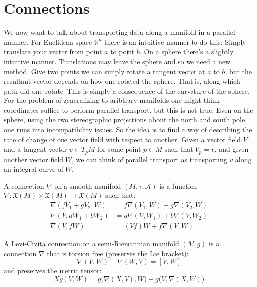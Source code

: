\section{Connections}
        We now want to talk about transporting data along a manifold in a
        parallel manner. For Euclidean space $\mathbb{R}^{n}$ there is an
        intuitive manner to do this: Simply translate your vector from point $a$
        to point $b$. On a sphere there's a slightly intuitive manner.
        Translations may leave the sphere and so we need a new method. Give two
        points we can simply rotate a tangent vector at $a$ to $b$, but the
        resultant vector depends on how one rotated the sphere. That is, along
        which path did one rotate. This is simply a consequence of the curvature
        of the sphere. For the problem of generalizing to aribtrary
        manifolds one might think coordinates suffice to perform parallel
        transport, but this is not true. Even on the sphere, using the two
        stereographic projections about the north and south pole, one runs into
        incompatibility issues. So the idea is to find a way of describing the
        rate of change of one vector field with respect to another. Given a
        vector field $V$ and a tangent vector $v\in{T}_{p}M$ for some point
        $p\in{M}$ such that $V_{p}=v$, and given another vector field $W$,
        we can think of parallel transport as transporting $v$ along an
        integral curve of $W$.
        \begin{definition}
            A connection $\nabla$ on a smooth manifold $(M,\tau,\mathcal{A})$
            is a function $\nabla:\mathfrak{X}(M)\times\mathfrak{X}(M)%
            \rightarrow\mathfrak{X}(M)$ such that:
            \begin{align}
                \nabla(fV_{1}+gV_{2},W)
                    &=f\nabla(V_{1},W)+g\nabla(V_{2},W)\\
                \nabla(V,aW_{1}+bW_{2})
                    &=a\nabla(V,W_{1})+b\nabla(V,W_{2})\\
                \nabla(V,fW)&=
                    (Vf)W+f\nabla(V,W)
            \end{align}
        \end{definition}
        \begin{definition}
            A Levi-Civita connection on a semi-Riemannian manifold
            $(M,g)$ is a connection $\nabla$ that is torsion
            free (preserves the Lie bracket):
            \begin{equation}
                \nabla(V,W)-\nabla(W,V)=[V,W]
            \end{equation}
            and preserves the metric tensor:
            \begin{equation}
                Xg(V,W)=g\big(\nabla(X,V),W\big)+g\big(V,\nabla(X,W)\big)
            \end{equation}
        \end{definition}
